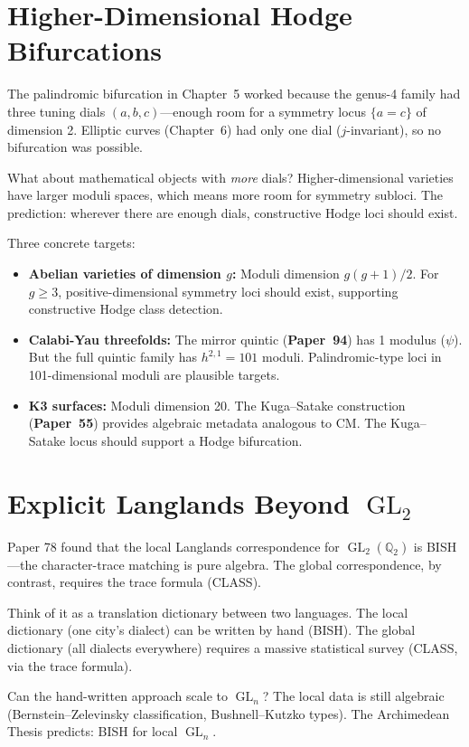 \documentclass[11pt,twoside,openany]{report}
\theoremstyle{remark}
\newcommand{\BISH}{\textsf{BISH}}
\newcommand{\CLASS}{\textsf{CLASS}}
\newcommand{\paperref}[1]{\textbf{Paper~#1}}
\DeclareMathOperator{\GL}{GL}
\begin{document}
\section{Higher-Dimensional Hodge Bifurcations}

\begin{analogybox}
The palindromic bifurcation in Chapter~5 worked because the genus-4 family had three tuning dials $(a,b,c)$---enough room for a symmetry locus $\{a = c\}$ of dimension 2. Elliptic curves (Chapter~6) had only one dial ($j$-invariant), so no bifurcation was possible.

What about mathematical objects with \emph{more} dials? Higher-dimensional varieties have larger moduli spaces, which means more room for symmetry subloci. The prediction: wherever there are enough dials, constructive Hodge loci should exist.
\end{analogybox}

Three concrete targets:
\begin{itemize}
  \item \textbf{Abelian varieties of dimension $g$:} Moduli dimension $g(g+1)/2$. For $g \geq 3$, positive-dimensional symmetry loci should exist, supporting constructive Hodge class detection.
  \item \textbf{Calabi-Yau threefolds:} The mirror quintic (\paperref{94}) has 1 modulus ($\psi$). But the full quintic family has $h^{2,1} = 101$ moduli. Palindromic-type loci in 101-dimensional moduli are plausible targets.
  \item \textbf{K3 surfaces:} Moduli dimension 20. The Kuga--Satake construction (\paperref{55}) provides algebraic metadata analogous to CM. The Kuga--Satake locus should support a Hodge bifurcation.
\end{itemize}


\section{Explicit Langlands Beyond $\GL_2$}

\begin{analogybox}
Paper 78 found that the local Langlands correspondence for $\GL_2(\mathbb{Q}_2)$ is \BISH---the character-trace matching is pure algebra. The global correspondence, by contrast, requires the trace formula (\CLASS).

Think of it as a translation dictionary between two languages. The local dictionary (one city's dialect) can be written by hand (\BISH). The global dictionary (all dialects everywhere) requires a massive statistical survey (\CLASS, via the trace formula).

Can the hand-written approach scale to $\GL_n$? The local data is still algebraic (Bernstein--Zelevinsky classification, Bushnell--Kutzko types). The Archimedean Thesis predicts: \BISH{} for local $\GL_n$.
\end{analogybox}
\end{document}
